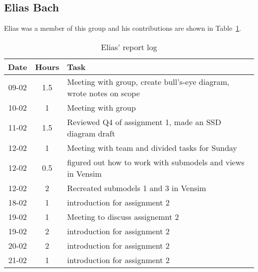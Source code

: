 
\subsection{Elias Bach}
Elias was a member of this group and his contributions are shown in Table~\ref{tab:elias_log}. 
\begin{longtable}[c]{c|c|m{35em}}
\caption{Elias' report log}
\label{tab:elias_log}\\
\textbf{Date}& \textbf{Hours} & \textbf{Task} \\
\hline
\endfirsthead
%
\endhead
%
09-02 & 1.5 & Meeting with group, create bull's-eye diagram, wrote notes on scope\\
10-02 & 1 & Meeting with group \\
11-02 & 1.5 & Reviewed Q4 of assignment 1, made an SSD diagram draft \\
12-02 & 1 & Meeting with team and divided tasks for Sunday\\ 
12-02 & 0.5 & figured out how to work with submodels and views in Vensim \\
12-02 & 2 & Recreated submodels 1 and 3 in Vensim \\
18-02 & 1 & introduction for assignment 2 \\
19-02 & 1 & Meeting to discuss assignemnt 2\\
19-02 & 2 & introduction for assignment 2 \\
20-02 & 2 & introduction for assignment 2 \\
21-02 & 1 & introduction for assignment 2 \\

\end{longtable}

